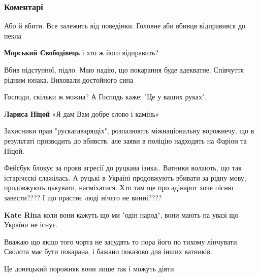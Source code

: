  
 
 
 
 
\subsubsection{Коментарі}

\begin{itemize} %
Або й вбити. Все залежить від поведінки. Головне аби вбивця відправився до пекла

\begin{itemize} %
\textbf{Морський Свободівець} і хто ж його відправить?
\end{itemize} %

Вбив підступної, підло. Маю надію, що покарання буде адекватне. Співчуття рідним юнака. Виховали достойного сина


Господи, скільки ж можна? А Господь каже: "Це у ваших руках".

\begin{itemize} %
\textbf{Лариса Ніцой} «Я дам Вам добре слово і камінь»

Захисники прав "рускагаварящіх", розпалюють міжнаціональну ворожнечу, що в результаті призводить до вбивств, але заяви в поліцію надходять на Фаріон та Ніцой.
\end{itemize} %


Фейсбук блокує за прояв агресії до руцкава ізика.. Ватники волають, що так
істарічєскі слажілась. А руцькі в Україні продовжують вбивати за рідну мову,
продовжують цькувати, насміхатися. Хто там ще про адінарот хоче пісню
завести???? І що прастиє люді нічєго не винні????

\begin{itemize} %
\textbf{Kate Rina} коли вони кажуть що ми "одін народ", вони мають на увазі що України не існує.
\end{itemize} %


Вважаю що якщо того чорта не засудять то пора його по тихому лінчувати. Сволота
має бути покарана, і бажано показово для інших ватників.

Це донецький порожняк вони лише так і можуть діяти

\end{itemize} %

